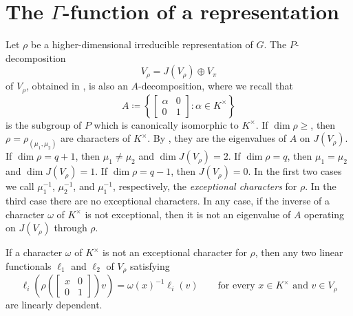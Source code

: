 \documentclass[../main.tex]{subfiles}
\begin{document}
\section{The \texorpdfstring{$\Gamma$}{ Gamma}-function of a representation}
Let $\rho$ be a higher-dimensional irreducible representation of $G$. The $P$-decomposition
\begin{equation}
	V_\rho=J(V_\rho)\oplus V_\pi \label{eq:decomp-res-rho}
\end{equation}
of $V_\rho$, obtained in , is also an $A$-decomposition, where we recall that
\[A\coloneqq\left\{\begin{bmatrix}
	\alpha & 0 \\
	0 & 1
\end{bmatrix}:\alpha\in K^\times\right\}\]
is the subgroup of $P$ which is canonically isomorphic to $K^\times$. If $\dim\rho\geq$, then $\rho=\rho_{(\mu_1,\mu_2)}$ are characters of $K^\times$. By , they are the eigenvalues of $A$ on $J(V_\rho)$. If $\dim\rho=q+1$, then $\mu_1\ne\mu_2$ and $\dim J(V_\rho)=2$. If $\dim\rho=q$, then $\mu_1=\mu_2$ and $\dim J(V_\rho)=1$. If $\dim\rho=q-1$, then $J(V_\rho)=0$. In the first two cases we call $\mu_1^{-1}$, $\mu_2^{-1}$, and $\mu_1^{-1}$, respectively, the \textit{exceptional characters} for $\rho$. In the third case there are no exceptional characters. In any case, if the inverse of a character $\omega$ of $K^\times$ is not exceptional, then it is not an eigenvalue of $A$ operating on $J(V_\rho)$ through $\rho$.
\begin{lemma} \label{lem:almost-gamma-func}
	If a character $\omega$ of $K^\times$ is not an exceptional character for $\rho$, then any two linear functionals $\ell_1$ and $\ell_2$ of $V_\rho$ satisfying
	\[\ell_i\left(\rho\left(\begin{bmatrix}
		x & 0 \\
		0 & 1
	\end{bmatrix}\right)v\right)=\omega(x)^{-1}\ell_i(v)\qquad\text{for every }x\in K^\times\text{ and }v\in V_\rho\]
	are linearly dependent.
\end{lemma}
\end{document}
